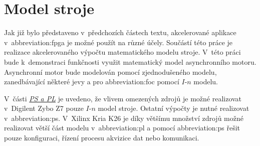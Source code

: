 \documentclass[a4paper, twoside, 11pt]{article}
\begin{document}
\section{Model stroje}\label{sec:model-stroje}
	Jak již bylo představeno v~předchozích částech textu, akcelerované aplikace v~\gls{abbreviation:fpga} je možné použít na různé účely. Součástí této práce je realizace akcelerovaného výpočtu matematického modelu stroje. V~této práci bude k~demonstraci funkčnosti využit matematický model asynchronního motoru. Asynchronní motor bude modelován pomocí zjednodušeného modelu, zanedbávající některé jevy a pro \gls{abbreviation:foc} pomocí $I$-$n$ modelu.\par
	V~části \hyperref[subsec:ps-a-pl]{\textit{PS a PL}} je uvedeno, že vlivem omezených zdrojů je možné realizovat v~Digilent Zybo Z7 pouze $I$-$n$ model stroje. Ostatní výpočty je nutné realizovat v~\gls{abbreviation:ps}. V~Xilinx Kria K26 je díky většímu množství zdrojů možné realizovat větší část modelu v~\gls{abbreviation:pl} a pomocí \gls{abbreviation:ps} řešit pouze konfiguraci, řízení procesu akvizice dat nebo komunikaci.\par
\end{document}
